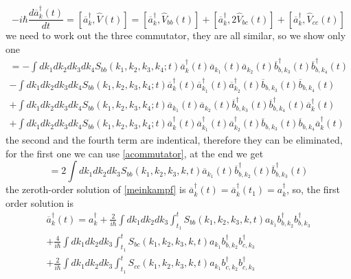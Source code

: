 \begin{equation}\label{meinkampf}-i\hbar \frac{d\overline{a}^\dagger_{k}(t)}{dt} = [\overline{a}^\dagger_{k},\hat{V}(t)] = [\overline{a}^\dagger_{k},\hat{V}_{bb}(t)] + [\overline{a}^\dagger_{k},2\hat{V}_{bc}(t)] +[\overline{a}^\dagger_{k},\hat{V}_{cc}(t)]\end{equation}
we need to work out the three commutator, they are all  similar, so we show only one
\begin{multline}[\overline{a}^\dagger_{k},\hat{V}_{bb}(t)] = -\int dk_1dk_2dk_3dk_4S_{bb}(k_1,k_2,k_3,k_4;t)\overline{a}^\dagger_{k}(t)\overline{a}_{k_1}(t)\overline{a}_{k_2}(t)\overline{b}_{b,k_3}^\dagger(t) \overline{b}_{b,k_4}^\dagger(t) \\
-\int dk_1dk_2dk_3dk_4S_{bb}(k_1,k_2,k_3,k_4;t)\overline{a}^\dagger_{k}(t)\overline{a}^\dagger_{k_1}(t)\overline{a}^\dagger_{k_2}(t)\overline{b}_{b,k_3}(t) \overline{b}_{b,k_4}(t) \\
+ \int dk_1dk_2dk_3dk_4S_{bb}(k_1,k_2,k_3,k_4;t)\overline{a}_{k_1}(t)\overline{a}_{k_2}(t)\overline{b}_{b,k_3}^\dagger(t) \overline{b}_{b,k_4}^\dagger(t)\overline{a}^\dagger_{k}(t)\\ 
+ \int dk_1dk_2dk_3dk_4S_{bb}(k_1,k_2,k_3,k{}_4;t)\overline{a}^\dagger_{k}(t)\overline{a}^\dagger_{k_1}(t)\overline{a}^\dagger_{k_2}(t)\overline{b}_{b,k_3}(t) \overline{b}_{b,k_4}\overline{a}^\dagger_{k}(t) \end{multline}
the second and the fourth term are indentical, therefore they can be eliminated, for the first one we can use \eqref{acommutator}, at the end we get
\begin{equation}[\overline{a}^\dagger_{k},\hat{V}_{bb}(t)] = 2\int dk_1 dk_2 dk_3 S_{bb}(k_1,k_2,k_3,k,t)\overline{a}_{k_1}(t)\overline{b}_{b,k_2}^\dagger(t)\overline{b}_{b,k_3}^\dagger(t)\end{equation}
the zeroth-order solution of \eqref{meinkampf} is $\overline{a}^\dagger_{k}(t) = \overline{a}^\dagger_{k}(t_1) = a_k^\dagger$, so, the first order solution is
\begin{multline}\label{abarra}\overline{a}^\dagger_{k}(t) = a_k^\dagger + \frac{2}{i\hbar}\int dk_1dk_2 dk_3 \int_{t_1}^tS_{bb}(k_1,k_2,k_3,k,t)a_{k_1}b_{b,k_2}^\dagger b_{b,k_3}^\dagger \\+\frac{4}{i\hbar}\int dk_1dk_2 dk_3 \int_{t_1}^tS_{bc}(k_1,k_2,k_3,k,t)a_{k_1}b_{b,k_2}^\dagger b_{c,k_3}^\dagger \\
+ \frac{2}{i\hbar}\int dk_1dk_2 dk_3 \int_{t_1}^tS_{cc}(k_1,k_2,k_3,k,t)a_{k_1}b_{c,k_2}^\dagger b_{c,k_3}^\dagger \end{multline}
